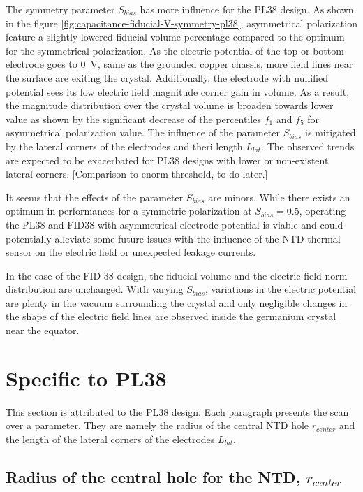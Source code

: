 The symmetry parameter $S_{bias}$ has more influence for the PL38 design. As shown in the figure \ref{fig:capacitance-fiducial-V-symmetry-pl38}, asymmetrical polarization feature a slightly lowered fiducial volume percentage compared to the optimum for the symmetrical polarization. As the electric potential of the top or bottom electrode goes to \SI{0}{\volt}, same as the grounded copper chassis, more field lines near the surface are exiting the crystal. Additionally, the electrode with nullified potential sees its low electric field magnitude corner gain in volume. As a result, the magnitude distribution over the crystal volume is broaden towards lower value as shown by the significant decrease of the percentiles $f_1$ and $f_5$ for asymmetrical polarization value.
The influence of the parameter $S_{bias}$ is mitigated by the lateral corners of the electrodes and theri length $L_{lat}$. The observed trends are expected to be exacerbated for PL38 designs with lower or non-existent lateral corners.
{\color{red} [Comparison to enorm threshold, to do later.]}

It seems that the effects of the parameter $S_{bias}$ are minors. While there exists an optimum in performances for a symmetric polarization at $S_{bias}=\num{0.5}$, operating the PL38 and FID38 with asymmetrical electrode potential is viable and could potentially alleviate some future issues with the influence of the NTD thermal sensor on the electric field or unexpected leakage currents.

In the case of the FID 38 design, the fiducial volume and the electric field norm distribution are unchanged. With varying $S_{bias}$, variations in the electric potential are plenty in the vacuum surrounding the crystal and only negligible changes in the shape of the electric field lines are observed inside the germanium crystal near the equator.


\section{Specific to PL38}

This section is attributed to the PL38 design. Each paragraph presents the scan over a parameter. They are namely the radius of the central NTD hole $r_{center}$ and the length of the lateral corners of the electrodes $L_{lat}$.


\subsection{Radius of the central hole for the NTD, $r_{center}$}

